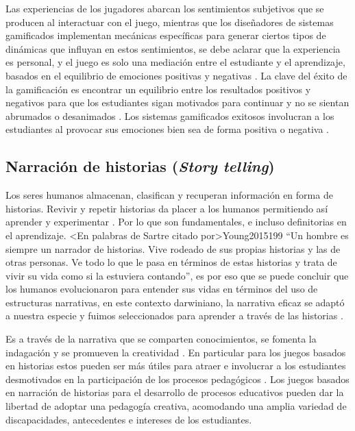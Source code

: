 Las experiencias de los jugadores abarcan los sentimientos subjetivos que se producen al interactuar con
el juego, mientras que los diseñadores de sistemas gamificados implementan mecánicas específicas para generar
ciertos tipos de dinámicas que influyan en estos sentimientos, se debe aclarar que la experiencia es personal,
y el juego es solo una mediación entre el estudiante y el aprendizaje, basados en el equilibrio de emociones
positivas y negativas \cite{PRESTOPNIK2015492}. La clave del éxito de la gamificación es encontrar un
equilibrio entre los resultados positivos y negativos para que los estudiantes sigan motivados para continuar y no
se sientan abrumados o desanimados \cite{8190501}. Los sistemas gamificados exitosos involucran a los
estudiantes al provocar sus emociones bien sea de forma positiva o negativa \cite{MULLINS2020304}.

\subsection{Narración de historias (\textit{Story telling})}

Los seres humanos almacenan, clasifican y recuperan información en forma de historias. Revivir y repetir
historias da placer a los humanos permitiendo así aprender y experimentar \cite{Brieger2013ExploringNC}. Por
lo que son fundamentales, e incluso definitorias en el aprendizaje. \citeA<En palabras de
Sartre citado por>{Young2015199} ``Un hombre es siempre un narrador de historias. Vive rodeado de sus propias
historias y las de otras personas. Ve todo lo que le pasa en términos de estas historias y trata de vivir su
vida como si la estuviera contando'', es por eso que se puede concluir que los humanos evolucionaron para 
entender sus vidas en términos del uso de estructuras narrativas, en este contexto darwiniano, la narrativa
eficaz se adaptó a nuestra especie y fuimos seleccionados para aprender a través de las historias
\cite{Young2015199}.

Es a través de la narrativa que se comparten conocimientos, se fomenta la indagación y se promueven la 
creatividad \cite{Young2015199}. En particular para los juegos basados en historias estos pueden ser más
útiles para atraer e involucrar a los estudiantes desmotivados en la participación de los procesos pedagógicos
\cite{PRESTOPNIK2015492}. Los juegos basados en narración de historias para el desarrollo de procesos 
educativos pueden dar la libertad de adoptar una pedagogía creativa, acomodando una amplia variedad de 
discapacidades, antecedentes e intereses de los estudiantes.

